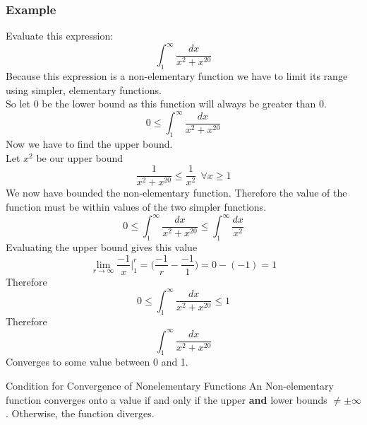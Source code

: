 \documentclass[letterpaper,10pt,twoside,twocolumn,openany]{book}
\begin{document}
\subsubsection{Example}
Evaluate this expression:
$$
    \int_1^\infty \frac{dx}{x^2+x^{20}}
$$
Because this expression is a non-elementary function we have to limit its range using simpler, elementary functions.\\
So let 0 be the lower bound as this function will always be greater than 0.
$$
    0 \leq \int_1^\infty \frac{dx}{x^2+x^{20}}
$$
Now we have to find the upper bound.\\ 
Let $x^2$ be our upper bound
$$
    \frac{1}{x^2 + x^{20}} \leq \frac{1}{x^2}\ \  \forall x \geq 1
$$
We now have bounded the non-elementary function. Therefore the value of the function must be within values of the two simpler functions.
$$
    0 \leq \int_1^\infty \frac{dx}{x^2+x^{20}} \leq \int_1^\infty \frac{dx}{x^2}
$$
Evaluating the upper bound gives this value
$$
    \lim_{r \to \infty} \frac{-1}{x}\biggl|_1^r = \biggl(\frac{-1}{r} - \frac{-1}{1}\biggl) = 0 - (-1) = 1
$$
Therefore
\newpage
$$
    0 \leq \int_1^\infty \frac{dx}{x^2+x^{20}} \leq 1
$$
Therefore
$$
    \int_1^\infty \frac{dx}{x^2+x^{20}}
$$
Converges to some value between 0 and 1.

\begin{DndSidebar}{Condition for Convergence of Nonelementary Functions}
    An Non-elementary function converges onto a value if and only if the upper \textbf{and} lower bounds $\neq \pm \infty$. Otherwise, the function diverges.
\end{DndSidebar}
\end{document}
